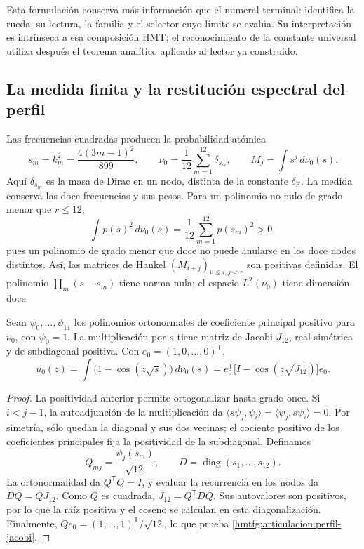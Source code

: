 Esta formulación conserva más información que el numeral terminal:
identifica la rueda, su lectura, la familia y el selector cuyo límite
se evalúa. Su interpretación es intrínseca a esa composición HMT;
el reconocimiento de la constante universal utiliza después el teorema
analítico aplicado al lector ya construido.

\subsection{La medida finita y la restitución espectral del perfil}
\label{hmtfg:articulacion:jacobi}

Las frecuencias cuadradas producen la probabilidad atómica
\begin{equation}
 s_m=k_m^2=\frac{4(3m-1)^2}{899},\qquad
 \nu_0=\frac1{12}\sum_{m=1}^{12}\delta_{s_m},\qquad
 M_j=\int s^j\,d\nu_0(s).
 \label{hmtfg:articulacion:medida-finita}
\end{equation}
Aquí \(\delta_{s_m}\) es la masa de Dirac en un nodo, distinta
de la constante \(\delta_{\mathrm F}\). La medida conserva las
doce frecuencias y sus pesos. Para un polinomio no nulo de grado menor
que \(r\le12\),
\[
 \int p(s)^2\,d\nu_0(s)
 =\frac1{12}\sum_{m=1}^{12}p(s_m)^2>0,
\]
pues un polinomio de grado menor que doce no puede anularse en los
doce nodos distintos. Así, las matrices de Hankel
\((M_{i+j})_{0\le i,j<r}\) son positivas definidas.
El polinomio \(\prod_m(s-s_m)\) tiene norma nula; el espacio
\(L^2(\nu_0)\) tiene dimensión doce.

\begin{proposition}
\label{hmtfg:articulacion:representacion}
Sean \(\psi_0,\ldots,\psi_{11}\) los polinomios ortonormales
de coeficiente principal positivo para \(\nu_0\), con
\(\psi_0=1\). La multiplicación por \(s\) tiene matriz de
Jacobi \(J_{12}\), real simétrica y de subdiagonal positiva.
Con \(e_0=(1,0,\ldots,0)^{\mathsf T}\),
\begin{equation}
 u_0(z)=\int\bigl(1-\cos(z\sqrt{s})\bigr)\,d\nu_0(s)
 =e_0^{\mathsf T}\bigl[I-\cos(z\sqrt{J_{12}})\bigr]e_0.
 \label{hmtfg:articulacion:perfil-jacobi}
\end{equation}
\end{proposition}
\begin{proof}
La positividad anterior permite ortogonalizar hasta grado once.
Si \(i<j-1\), la autoadjunción de la multiplicación da
\(\langle s\psi_j,\psi_i\rangle
=\langle\psi_j,s\psi_i\rangle=0\).
Por simetría, sólo quedan la diagonal y sus dos vecinas; el cociente
positivo de los coeficientes principales fija la positividad de la
subdiagonal. Definamos
\[
 Q_{mj}=\frac{\psi_j(s_m)}{\sqrt{12}},\qquad
 D=\operatorname{diag}(s_1,\ldots,s_{12}).
\]
La ortonormalidad da \(Q^{\mathsf T}Q=I\), y evaluar la
recurrencia en los nodos da \(DQ=QJ_{12}\). Como \(Q\) es
cuadrada, \(J_{12}=Q^{\mathsf T}DQ\). Sus autovalores son
positivos, por lo que la raíz positiva y el coseno se calculan en
esta diagonalización. Finalmente,
\(Qe_0=(1,\ldots,1)^{\mathsf T}/\sqrt{12}\), lo que prueba
\eqref{hmtfg:articulacion:perfil-jacobi}.
\end{proof}

